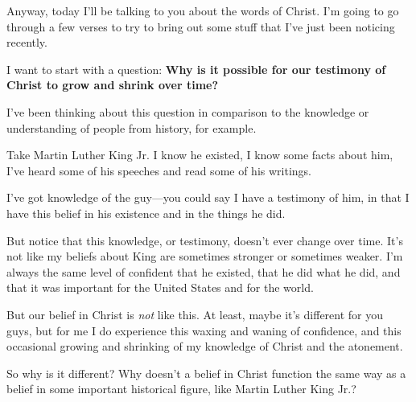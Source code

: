 \begin{compactitem}
			\item Anyway, today I'll be talking to you about the words of Christ. I'm going to go through a few verses to try to bring out some stuff that I've just been noticing recently.
			
			\item I want to start with a question: \textbf{Why is it possible for our testimony of Christ to grow and shrink over time?}
				\begin{compactitem}
					\item I've been thinking about this question in comparison to the knowledge or understanding of people from history, for example.
					\item Take Martin Luther King Jr. I know he existed, I know some facts about him, I've heard some of his speeches and read some of his writings.
					\item I've got knowledge of the guy---you could say I have a testimony of him, in that I have this belief in his existence and in the things he did.
					\item But notice that this knowledge, or testimony, doesn't ever change over time. It's not like my beliefs about King are sometimes stronger or sometimes weaker. I'm always the same level of confident that he existed, that he did what he did, and that it was important for the United States and for the world.
					\item But our belief in Christ is \textit{not} like this. At least, maybe it's different for you guys, but for me I do experience this waxing and waning of confidence, and this occasional growing and shrinking of my knowledge of Christ and the atonement.
					\item So why is it different? Why doesn't a belief in Christ function the same way as a belief in some important historical figure, like Martin Luther King Jr.?
				\end{compactitem}
				

\end{compactitem}
